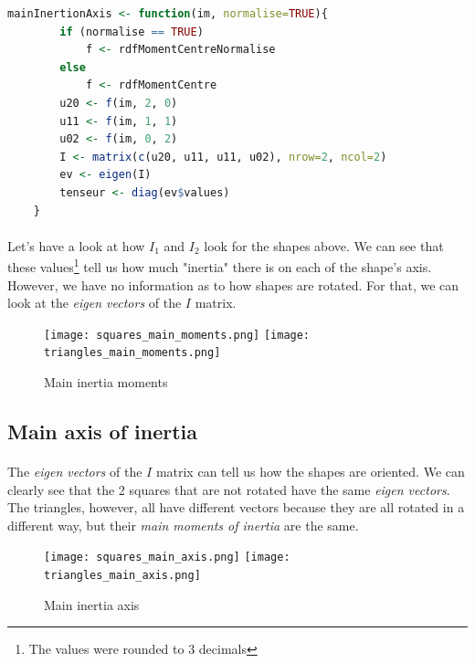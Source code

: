 \begin{lstlisting}[language=R, caption=Calculating the main moments of inertia]    
    mainInertionAxis <- function(im, normalise=TRUE){
        if (normalise == TRUE)
            f <- rdfMomentCentreNormalise
        else
            f <- rdfMomentCentre
        u20 <- f(im, 2, 0)
        u11 <- f(im, 1, 1)
        u02 <- f(im, 0, 2)
        I <- matrix(c(u20, u11, u11, u02), nrow=2, ncol=2)
        ev <- eigen(I)
        tenseur <- diag(ev$values)
    }
\end{lstlisting}

\clearpage

\paragraph{}
Let's have a look at how $I_1$ and $I_2$ look for the shapes above. We can see that these values\footnote{The values were rounded to 3 decimals} tell us how much "inertia" there is on each of the shape's axis.
However, we have no information as to how shapes are rotated. For that, we can look at the \emph{eigen vectors} of the $I$ matrix. 

\begin{figure}[h]
    \centering
    \texttt{[image: squares\_main\_moments.png]}
    \texttt{[image: triangles\_main\_moments.png]}
    \caption{Main inertia moments}
    \label{fig:main_inertia_moments}
\end{figure}

\subsection{Main axis of inertia}
\paragraph{}
The \emph{eigen vectors} of the $I$ matrix can tell us how the shapes are oriented.
We can clearly see that the 2 squares that are not rotated have the same \emph{eigen vectors}. The triangles, however, all have different vectors because they are all rotated in a different way, but their \emph{main moments of inertia} are the same.

\begin{figure}[h]
    \centering
    \texttt{[image: squares\_main\_axis.png]}
    \texttt{[image: triangles\_main\_axis.png]}
    \caption{Main inertia axis}
    \label{fig:main_inertia_axis}
\end{figure}


